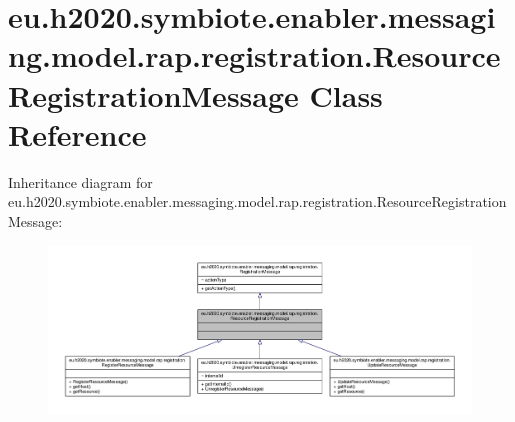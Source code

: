 \hypertarget{classeu_1_1h2020_1_1symbiote_1_1enabler_1_1messaging_1_1model_1_1rap_1_1registration_1_1ResourceRegistrationMessage}{}\section{eu.\+h2020.\+symbiote.\+enabler.\+messaging.\+model.\+rap.\+registration.\+Resource\+Registration\+Message Class Reference}
\label{classeu_1_1h2020_1_1symbiote_1_1enabler_1_1messaging_1_1model_1_1rap_1_1registration_1_1ResourceRegistrationMessage}


Inheritance diagram for eu.\+h2020.\+symbiote.\+enabler.\+messaging.\+model.\+rap.\+registration.\+Resource\+Registration\+Message\+:
\nopagebreak
\begin{figure}[H]
\begin{center}
\leavevmode
\includegraphics[width=350pt]{classeu_1_1h2020_1_1symbiote_1_1enabler_1_1messaging_1_1model_1_1rap_1_1registration_1_1Resource2ee966fc849cd384f6747469f205792b}
\end{center}
\end{figure}


